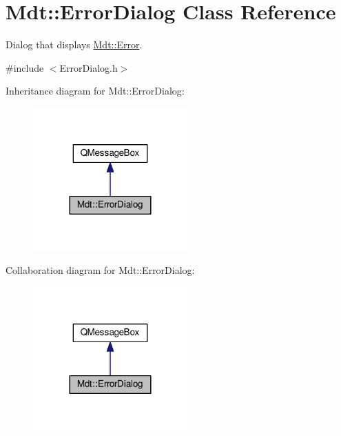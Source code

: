 \hypertarget{class_mdt_1_1_error_dialog}{}\section{Mdt\+:\+:Error\+Dialog Class Reference}
\label{class_mdt_1_1_error_dialog}


Dialog that displays \hyperlink{class_mdt_1_1_error}{Mdt\+::\+Error}.  




{\ttfamily \#include $<$Error\+Dialog.\+h$>$}



Inheritance diagram for Mdt\+:\+:Error\+Dialog\+:
\nopagebreak
\begin{figure}[H]
\begin{center}
\leavevmode
\includegraphics[width=168pt]{class_mdt_1_1_error_dialog__inherit__graph}
\end{center}
\end{figure}


Collaboration diagram for Mdt\+:\+:Error\+Dialog\+:
\nopagebreak
\begin{figure}[H]
\begin{center}
\leavevmode
\includegraphics[width=168pt]{class_mdt_1_1_error_dialog__coll__graph}
\end{center}
\end{figure}
